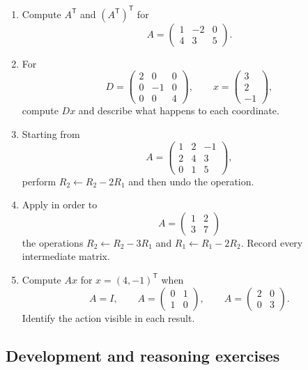 \begin{enumerate}
\item Compute $A^{\mathsf T}$ and $(A^{\mathsf T})^{\mathsf T}$ for
\[
A=\begin{pmatrix}1&-2&0\\4&3&5\end{pmatrix}.
\]

\item For
\[
D=\begin{pmatrix}2&0&0\\0&-1&0\\0&0&4\end{pmatrix},
\qquad
x=\begin{pmatrix}3\\2\\-1\end{pmatrix},
\]
compute $Dx$ and describe what happens to each coordinate.

\item Starting from
\[
A=\begin{pmatrix}1&2&-1\\2&4&3\\0&1&5\end{pmatrix},
\]
perform $R_2\leftarrow R_2-2R_1$ and then undo the operation.

\item Apply in order to
\[
A=\begin{pmatrix}1&2\\3&7\end{pmatrix}
\]
the operations $R_2\leftarrow R_2-3R_1$ and $R_1\leftarrow R_1-2R_2$. Record every intermediate matrix.

\item Compute $Ax$ for $x=(4,-1)^{\mathsf T}$ when
\[
A=I,
\qquad
A=\begin{pmatrix}0&1\\1&0\end{pmatrix},
\qquad
A=\begin{pmatrix}2&0\\0&3\end{pmatrix}.
\]
Identify the action visible in each result.
\end{enumerate}

\subsection{Development and reasoning exercises}

